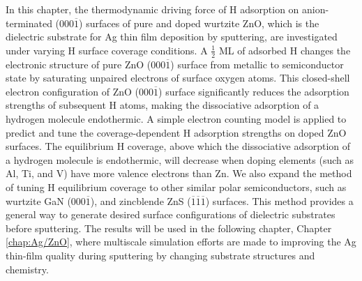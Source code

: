 In this chapter, the thermodynamic driving force of H adsorption on anion-terminated (000$\overline{1}$) surfaces of pure and doped wurtzite ZnO, which is the dielectric substrate for Ag thin film deposition by sputtering, are investigated under varying H surface coverage conditions. A $\frac{1}{2}$ \ac{ML} of adsorbed H changes the electronic structure of pure ZnO (000$\overline{1}$) surface from metallic to semiconductor state by saturating unpaired electrons of surface oxygen atoms. This closed-shell electron configuration of ZnO (000$\overline{1}$) surface significantly reduces the adsorption strengths of subsequent H atoms, making the dissociative adsorption of a hydrogen molecule endothermic. A simple electron counting model is applied to predict and tune the coverage-dependent H adsorption strengths on doped ZnO surfaces. The equilibrium H coverage, above which the dissociative adsorption of a hydrogen molecule is endothermic, will decrease when doping elements (such as Al, Ti, and V) have more valence electrons than Zn. We also expand the method of tuning H equilibrium coverage to other similar polar semiconductors, such as wurtzite GaN (000$\overline{1}$), and zincblende ZnS ($\overline{1}$$\overline{1}$$\overline{1}$) surfaces. This method provides a general way to generate desired surface configurations of dielectric substrates before sputtering. The results will be used in the following chapter, Chapter \ref{chap:Ag/ZnO}, where multiscale simulation efforts are made to improving the Ag thin-film quality during sputtering by changing substrate structures and chemistry.






